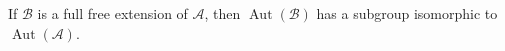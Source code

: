 If $\mathcal{B}$ is a full free extension of $\mathcal{A}$, then $\operatorname{Aut}(\mathcal{B})$ has a subgroup isomorphic to $\operatorname{Aut}(\mathcal{A})$.
